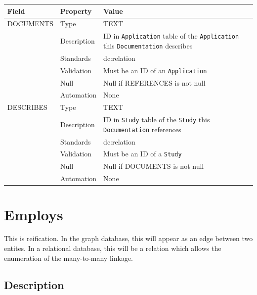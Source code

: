 \documentclass[
]{article}
\newcounter{none} %
\begin{document}
{\def\LTcaptype{none} %
\begin{longtable}[]{@{}
  >{\raggedright\arraybackslash}p{}
  >{\raggedright\arraybackslash}p{}
  >{\raggedright\arraybackslash}p{}@{}}
\toprule\noalign{}
\begin{minipage}[b]{\linewidth}\raggedright
Field
\end{minipage} & \begin{minipage}[b]{\linewidth}\raggedright
Property
\end{minipage} & \begin{minipage}[b]{\linewidth}\raggedright
Value
\end{minipage} \\
\midrule\noalign{}
\endhead
\bottomrule\noalign{}
\endlastfoot
DOCUMENTS & Type & TEXT \\
& Description & ID in \texttt{Application} table of the
\texttt{Application} this \texttt{Documentation} describes \\
& Standards & dc:relation \\
& Validation & Must be an ID of an \texttt{Application} \\
& Null & Null if REFERENCES is not null \\
& Automation & None \\
DESCRIBES & Type & TEXT \\
& Description & ID in \texttt{Study} table of the \texttt{Study} this
\texttt{Documentation} references \\
& Standards & dc:relation \\
& Validation & Must be an ID of a \texttt{Study} \\
& Null & Null if DOCUMENTS is not null \\
& Automation & None \\
\end{longtable}
}

\section{Employs}\label{employs}

This is reification. In the graph database, this will appear as an edge
between two entites. In a relational database, this will be a relation
which allows the enumeration of the many-to-many linkage.

\subsection{Description}\label{description-12}
\end{document}
